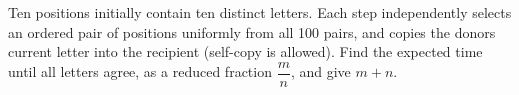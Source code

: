 Ten positions initially contain ten distinct letters. Each step independently selects an ordered pair of positions uniformly from all 100 pairs, and copies the donor\textquotesingle s current letter into the recipient (self-copy is allowed). Find the expected time until all letters agree, as a reduced fraction $\dfrac{m}{n}$, and give $m+n$.
